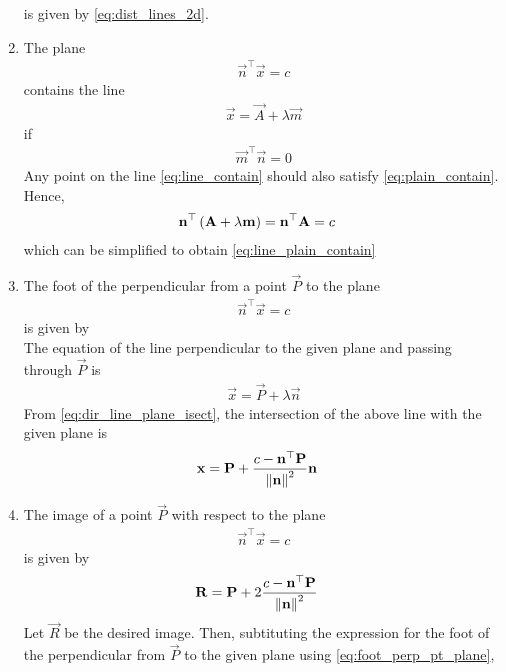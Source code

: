 \documentclass[journal,12pt,onecolumn]{IEEEtran}
\renewcommand\thesection{\arabic{section}}
\renewcommand\thesubsection{\thesection.\arabic{subsection}}
\begin{document}
\begin{enumerate}[label=\thesubsection.\arabic*.,ref=\thesubsection.\theenumi]
	is given by 
	\eqref{eq:dist_lines_2d}.
\item The plane 
		\begin{align}
		\vec{n}^{\top}
			\vec{x} = c
			\label{eq:plain_contain}
		\end{align}
		contains the line 
		\begin{align}
			\vec{x} = \vec{A}+\lambda \vec{m}
			\label{eq:line_contain}
		\end{align}
		if 
		\begin{align}
		\vec{m}^{\top}\vec{n} = 0
			\label{eq:line_plain_contain}
		\end{align}
		\solution Any point on the line 
			\eqref{eq:line_contain}
			should also satisfy 
			\eqref{eq:plain_contain}.  Hence, 
		\begin{align}
			\mathbf{n}^{\top}\left(\mathbf{A}+\lambda \mathbf{m}\right) &= \mathbf{n}^{\top}\mathbf{A}=c
		\end{align}
		which can be simplified to obtain
			\eqref{eq:line_plain_contain}
		\item The foot of the perpendicular from a point $\vec{P}$ to the plane 
		\begin{align}
			\vec{n}^{\top}\vec{x} =c
		\end{align}
		is given by 
		\\
		\solution The equation of the line perpendicular to the given plane and passing through $\vec{P}$ is 
		\begin{align}
			\vec{x} = \vec{P} + \lambda 	\vec{n}
		\end{align}
		From 
	\eqref{eq:dir_line_plane_isect}, the intersection of the above line with the given plane is 
\begin{align}
	\mathbf{x} &= \mathbf{P} + \frac{c - \mathbf{n}^{\top}\mathbf{P}}{\left\lVert\mathbf{n}\right\rVert^2}
\mathbf{n}
	\label{eq:foot_perp_pt_plane}
\end{align}
\item The image of a point $\vec{P}$ with respect to the plane 
		\begin{align}
			\vec{n}^{\top}\vec{x} =c
		\end{align}
		is given by 
		\begin{align}
			\mathbf{R} &=
	  \mathbf{P} + 2\frac{c - \mathbf{n}^{\top}\mathbf{P}}{\left\lVert\mathbf{n}\right\rVert^2}
			\label{eq:image_pt_plane}
		\end{align}
		\solution Let $\vec{R}$ be the desired image.  Then, subtituting the expression for the  foot of the perpendicular from $\vec{P}$ to the given plane using 
	\eqref{eq:foot_perp_pt_plane},
		\begin{align}

\end{align}
\end{enumerate}
\end{document}
